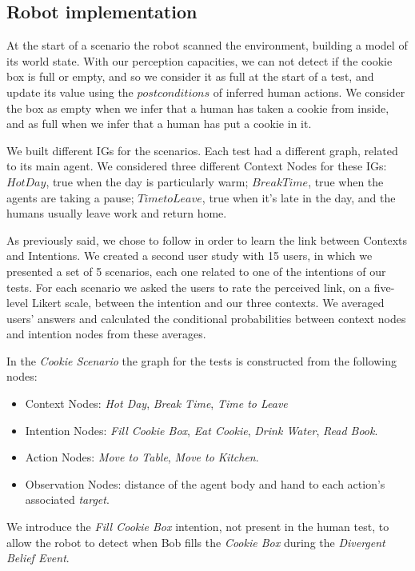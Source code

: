 \subsection{Robot implementation}
At the start of a scenario the robot scanned the environment, building a model of its world state. With our perception capacities, we can not detect if the cookie box is full or empty, and so we consider it as full at the start of a test, and update its value using the $postconditions$ of inferred human actions. We consider the box as empty when we infer that a human has taken a cookie from inside, and as full when we infer that a human has put a cookie in it.

We built different IGs for the scenarios. Each test had a different graph, related to its main agent. We considered three different Context Nodes for these IGs: $Hot Day$, true when the day is particularly warm; $Break Time$, true when the agents are taking a pause; $Time to Leave$, true when it's late in the day, and the humans usually leave work and return home.

As previously said, we chose to follow \cite{Liu2014} in order to learn the link between Contexts and Intentions. We created a second user study with 15 users, in which we presented a set of 5 scenarios, each one related to one of the intentions of our tests. For each scenario we asked the users to rate the perceived link, on a five-level Likert scale, between the intention and our three contexts. We averaged users' answers and calculated the conditional probabilities between context nodes and intention nodes from these averages.


In the \textit{Cookie Scenario} the graph for the tests is constructed from the following nodes:
\begin{itemize}
\item Context Nodes: \textit{Hot Day}, \textit{Break Time}, \textit{Time to Leave}
\item Intention Nodes: \textit{Fill Cookie Box}, \textit{Eat Cookie}, \textit{Drink Water}, \textit{Read Book}.
\item Action Nodes: \textit{Move to Table}, \textit{Move to Kitchen}.
\item Observation Nodes: distance of the agent body and hand to each action's associated \textit{target}.
\end{itemize}

We introduce the \textit{Fill Cookie Box} intention, not present in the human test, to allow the robot to detect when Bob fills the \textit{Cookie Box} during the \textit{Divergent Belief Event}.


